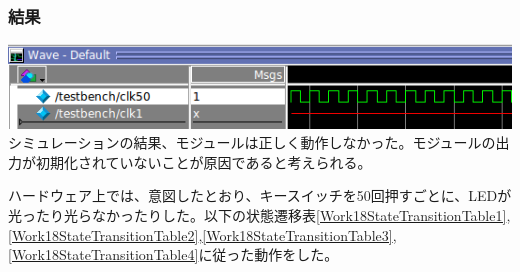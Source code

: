 \documentclass[a4paper]{jarticle}
\begin{document}
\subsubsection{結果}
\includegraphics[width=15cm]{work18/Simulation.png}\\
シミュレーションの結果、モジュールは正しく動作しなかった。モジュールの出力が初期化されていないことが原因であると考えられる。

ハードウェア上では、意図したとおり、キースイッチを50回押すごとに、LEDが光ったり光らなかったりした。以下の状態遷移表\ref{Work18StateTransitionTable1},\ref{Work18StateTransitionTable2},\ref{Work18StateTransitionTable3},\ref{Work18StateTransitionTable4}に従った動作をした。
\end{document}
